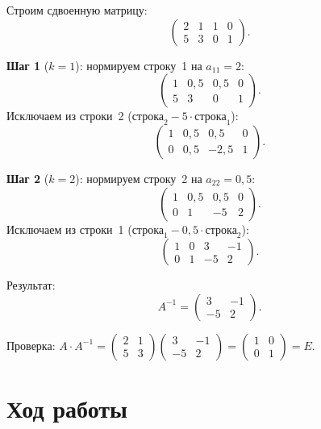 \documentclass[12pt,a4paper]{scrartcl}
\begin{document}
Строим сдвоенную матрицу:
\[
    \left(\begin{array}{cc|cc}
        2 & 1 & 1 & 0 \\
        5 & 3 & 0 & 1
    \end{array}\right).
\]

\textbf{Шаг 1} ($k=1$): нормируем строку~1 на $a_{11}=2$:
\[
    \left(\begin{array}{cc|cc}
        1 & 0{,}5 & 0{,}5 & 0 \\
        5 & 3     & 0     & 1
    \end{array}\right).
\]
Исключаем из строки~2 ($\text{строка}_2 - 5 \cdot \text{строка}_1$):
\[
    \left(\begin{array}{cc|cc}
        1 & 0{,}5 & 0{,}5  & 0 \\
        0 & 0{,}5 & -2{,}5 & 1
    \end{array}\right).
\]

\textbf{Шаг 2} ($k=2$): нормируем строку~2 на $a_{22}=0{,}5$:
\[
    \left(\begin{array}{cc|cc}
        1 & 0{,}5 & 0{,}5 & 0 \\
        0 & 1     & -5    & 2
    \end{array}\right).
\]
Исключаем из строки~1 ($\text{строка}_1 - 0{,}5 \cdot \text{строка}_2$):
\[
    \left(\begin{array}{cc|cc}
        1 & 0 &  3 & -1 \\
        0 & 1 & -5 &  2
    \end{array}\right).
\]

Результат:
\[
    A^{-1} =
    \begin{pmatrix}
         3 & -1 \\
        -5 &  2
    \end{pmatrix}.
\]

Проверка: $A \cdot A^{-1} = \begin{pmatrix}2&1\\5&3\end{pmatrix}
\begin{pmatrix}3&-1\\-5&2\end{pmatrix} =
\begin{pmatrix}1&0\\0&1\end{pmatrix} = E$. \checkmark

\section{Ход работы}
\label{sec:work}
\end{document}

